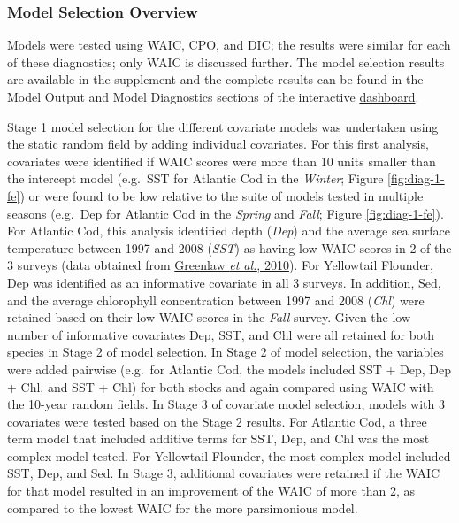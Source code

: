\documentclass[
]{article}
\begin{document}
\hypertarget{model-selection-overview}{%
\subsubsection{Model Selection Overview}\label{model-selection-overview}}

Models were tested using WAIC, CPO, and DIC; the results were similar for each of these diagnostics; only WAIC is discussed further. The model selection results are available in the supplement and the complete results can be found in the Model Output and Model Diagnostics sections of the interactive \href{https://github.com/Dave-Keith/Paper_2_SDMs/tree/master/Dashboard}{dashboard}.

Stage 1 model selection for the different covariate models was undertaken using the static random field by adding individual covariates. For this first analysis, covariates were identified if WAIC scores were more than 10 units smaller than the intercept model (e.g.~SST for Atlantic Cod in the \emph{Winter}; Figure \ref{fig:diag-1-fe}) or were found to be low relative to the suite of models tested in multiple seasons (e.g.~Dep for Atlantic Cod in the \emph{Spring} and \emph{Fall}; Figure \ref{fig:diag-1-fe}). For Atlantic Cod, this analysis identified depth (\emph{Dep}) and the average sea surface temperature between 1997 and 2008 (\emph{SST}) as having low WAIC scores in 2 of the 3 surveys (data obtained from \protect\hyperlink{ref-greenlawGeodatabaseHistoricalContemporary2010}{Greenlaw \emph{et al.}, 2010}). For Yellowtail Flounder, Dep was identified as an informative covariate in all 3 surveys. In addition, Sed, and the average chlorophyll concentration between 1997 and 2008 (\emph{Chl}) were retained based on their low WAIC scores in the \emph{Fall} survey. Given the low number of informative covariates Dep, SST, and Chl were all retained for both species in Stage 2 of model selection. In Stage 2 of model selection, the variables were added pairwise (e.g.~for Atlantic Cod, the models included SST + Dep, Dep + Chl, and SST + Chl) for both stocks and again compared using WAIC with the 10-year random fields. In Stage 3 of covariate model selection, models with 3 covariates were tested based on the Stage 2 results. For Atlantic Cod, a three term model that included additive terms for SST, Dep, and Chl was the most complex model tested. For Yellowtail Flounder, the most complex model included SST, Dep, and Sed. In Stage 3, additional covariates were retained if the WAIC for that model resulted in an improvement of the WAIC of more than 2, as compared to the lowest WAIC for the more parsimonious model.
\end{document}
